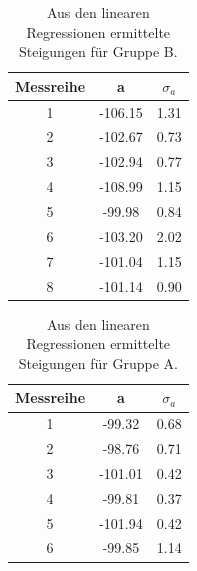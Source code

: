 \documentclass[12pt,a4paper]{article}
\begin{document}
\begin{table}
\begin{center}
\begin{tabular}{|c|c|c|}
\hline 
Messreihe & a & $\sigma _a$ \\ 
\hline 
1 & -106.15 & 1.31 \\ 
\hline 
2 & -102.67 & 0.73 \\ 
\hline 
3 & -102.94 & 0.77 \\ 
\hline 
4 & -108.99 & 1.15 \\ 
\hline 
5 & -99.98 & 0.84 \\ 
\hline 
6 & -103.20 & 2.02 \\ 
\hline 
7 & -101.04 & 1.15 \\ 
\hline 
8 & -101.14 & 0.90 \\ 
\hline 
\end{tabular} 
\caption{Aus den linearen Regressionen ermittelte Steigungen für Gruppe B.}
\label{tab:Druck_Steigungen_B}
\end{center}
\end{table}

\begin{table}
\begin{center}
\begin{tabular}{|c|c|c|}
\hline 
Messreihe & a & $\sigma _a$ \\ 
\hline 
1 & -99.32 & 0.68 \\ 
\hline 
2 & -98.76 & 0.71 \\ 
\hline 
3 & -101.01 & 0.42 \\ 
\hline 
4 & -99.81 & 0.37 \\ 
\hline 
5 & -101.94 & 0.42 \\ 
\hline 
6 & -99.85 & 1.14 \\  
\hline 
\end{tabular} 
\caption{Aus den linearen Regressionen ermittelte Steigungen für Gruppe A.}
\label{tab:Druck_Steigungen_A}
\end{center}
\end{table}
\end{document}
